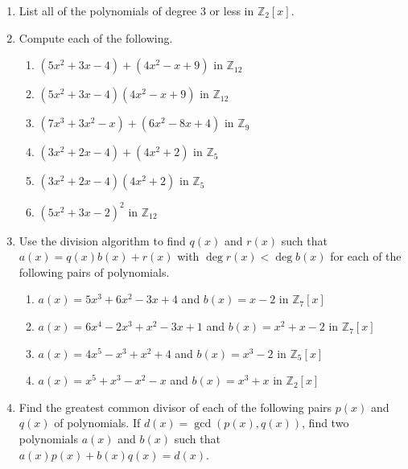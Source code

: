 {\small
\begin{enumerate}

\item
List all of the polynomials of degree 3 or less in ${\mathbb Z}_2[x]$.

\item
Compute each of the following.
\begin{enumerate}
 
 \item
$(5x^2 + 3x - 4) + (4x^2 - x + 9)$ in ${\mathbb Z}_{12}$
 
 \item
$(5x^2 + 3x - 4) (4x^2 - x + 9)$ in ${\mathbb Z}_{12}$
 
 \item
$(7x^3 + 3x^2 - x) + (6x^2 - 8x + 4)$ in ${\mathbb Z}_9$
 
 \item
$(3x^2 + 2x - 4) + (4x^2 + 2)$ in ${\mathbb Z}_5$
  
 \item
$(3x^2 + 2x - 4) (4x^2 + 2)$ in ${\mathbb Z}_5$
 
 \item
$(5x^2 + 3x - 2)^2$ in ${\mathbb Z}_{12}$
 
\end{enumerate}

\item
Use the division algorithm to find $q(x)$ and $r(x)$ such that $a(x) = q(x) b(x) + r(x)$ with $\deg r(x) < \deg b(x)$ for each of the following  pairs of polynomials.  
\begin{enumerate}
 
 \item
$a(x) = 5 x^3 + 6x^2 -  3 x + 4$ and $b(x) = x - 2$ in ${\mathbb Z}_7[x]$
 
 \item
$a(x) = 6 x^4 - 2 x^3 +  x^2 - 3 x + 1$ and $b(x) = x^2 + x - 2$ in ${\mathbb Z}_7[x]$
 
 \item
$a(x) = 4 x^5 - x^3 + x^2 + 4$ and $b(x) = x^3 - 2$ in ${\mathbb Z}_5[x]$ 
 
 \item
$a(x) = x^5 + x^3 -x^2 - x$ and $b(x) = x^3 + x$ in ${\mathbb Z}_2[x]$
 
\end{enumerate}

\item
Find the greatest common divisor of each of the following pairs $p(x)$ and $q(x)$ of polynomials. If $d(x) = \gcd( p(x), q(x) )$, find two polynomials $a(x)$ and $b(x)$ such that $a(x) p(x) + b(x) q(x) = d(x)$. 
\begin{enumerate}
 

\end{enumerate}
\end{enumerate}}
